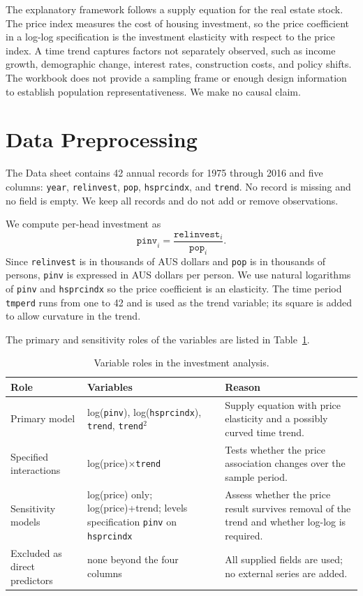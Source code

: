 \documentclass[conference]{IEEEtran}
\begin{document}
The explanatory framework follows a supply equation for the real estate stock. The price index measures the cost of housing investment, so the price coefficient in a log-log specification is the investment elasticity with respect to the price index. A time trend captures factors not separately observed, such as income growth, demographic change, interest rates, construction costs, and policy shifts. The workbook does not provide a sampling frame or enough design information to establish population representativeness. We make no causal claim.

\section{Data Preprocessing}
The Data sheet contains 42 annual records for 1975 through 2016 and five columns: \texttt{year}, \texttt{relinvest}, \texttt{pop}, \texttt{hsprcindx}, and \texttt{trend}. No record is missing and no field is empty. We keep all records and do not add or remove observations.

We compute per-head investment as
\[
\texttt{pinv}_i = \frac{\texttt{relinvest}_i}{\texttt{pop}_i}.
\]
Since \texttt{relinvest} is in thousands of AUS dollars and \texttt{pop} is in thousands of persons, \texttt{pinv} is expressed in AUS dollars per person. We use natural logarithms of \texttt{pinv} and \texttt{hsprcindx} so the price coefficient is an elasticity. The time period \texttt{tmperd} runs from one to 42 and is used as the trend variable; its square is added to allow curvature in the trend.

The primary and sensitivity roles of the variables are listed in Table~\ref{tab:variables}.

\begin{table}[!t]
\centering
\caption{Variable roles in the investment analysis.}
\label{tab:variables}
\small
\begin{tabularx}{\textwidth}{>{\raggedright\arraybackslash}p{}>{\raggedright\arraybackslash}p{}>{\raggedright\arraybackslash}X}
\toprule
Role & Variables & Reason \\
\midrule
Primary model & log(\texttt{pinv}), log(\texttt{hsprcindx}), \texttt{trend}, \texttt{trend}$^2$ & Supply equation with price elasticity and a possibly curved time trend. \\
Specified interactions & log(price)$\times$\texttt{trend} & Tests whether the price association changes over the sample period. \\
Sensitivity models & log(price) only; log(price)+trend; levels specification \texttt{pinv} on \texttt{hsprcindx} & Assess whether the price result survives removal of the trend and whether log-log is required. \\
Excluded as direct predictors & none beyond the four columns & All supplied fields are used; no external series are added. \\
\bottomrule
\end{tabularx}
\end{table}
\end{document}
